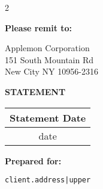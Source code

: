 \documentclass[american,letterpaper,10pt]{article}
\begin{document}
\begin{multicols}{2}
\textbf{Please remit to:}
\smallskip

Applemon Corporation \\
151 South Mountain Rd \\
New City NY 10956-2316
\begin{flushright}
\textbf{\huge STATEMENT}
\smallskip

\begin{tabular}{c}
\textbf{Statement Date} \\
\midrule \midrule
{{ date }} \\
\end{tabular}
\end{flushright}
\end{multicols}

\bigskip

\textbf{Prepared for:} \medskip

\bigskip

\qquad \begin{minipage}[t]{5in}
\small \begin{alltt}
{{ client.address|upper }}
\end{alltt}
\end{minipage}

\bigskip
\end{document}
